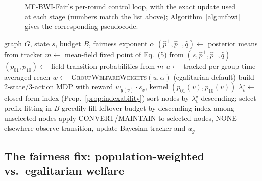 \documentclass[journal]{IEEEtran}
\begin{document}
\begin{figure}[t]
{
}
\caption{MF-BWI-Fair's per-round control loop, with the exact update used
at each stage (numbers match the list above); Algorithm~\ref{alg:mfbwi}
gives the corresponding pseudocode.}
\label{fig:pipeline}
\end{figure}

\begin{algorithm}[t]
\caption{MF-BWI-Fair, one round}
\label{alg:mfbwi}
\begin{algorithmic}[1]
\REQUIRE graph $G$, state $s$, budget $B$, fairness exponent $\alpha$
\STATE $(\hat p^+,\hat p^-,\hat q) \gets$ posterior means from tracker
\STATE $m \gets$ mean-field fixed point of Eq.~(5) from $(s,\hat p^+,\hat p^-,\hat q)$
\STATE $(p_{01}, p_{10}) \gets$ field transition probabilities from $m$
\STATE $u \gets$ tracked per-group time-averaged reach
\STATE $w \gets$ \textsc{GroupWelfareWeights}$(u, \alpha)$ \hfill (egalitarian default)
  \STATE build 2-state/3-action MDP with reward $w_{g(v)}\cdot s_v$, kernel $(p_{01}(v), p_{10}(v))$
  \STATE $\lambda^\star_v \gets$ closed-form index (Prop.~\ref{prop:indexability})
\ENDFOR
\STATE sort nodes by $\lambda^\star_v$ descending; select prefix fitting in $B$
\STATE greedily fill leftover budget by descending index among unselected nodes
\STATE apply CONVERT/MAINTAIN to selected nodes, NONE elsewhere
\STATE observe transition, update Bayesian tracker and $u_g$
\end{algorithmic}
\end{algorithm}

\subsection{The fairness fix: population-weighted vs.\ egalitarian welfare}
\label{sec:fairness-fix}
\end{document}

